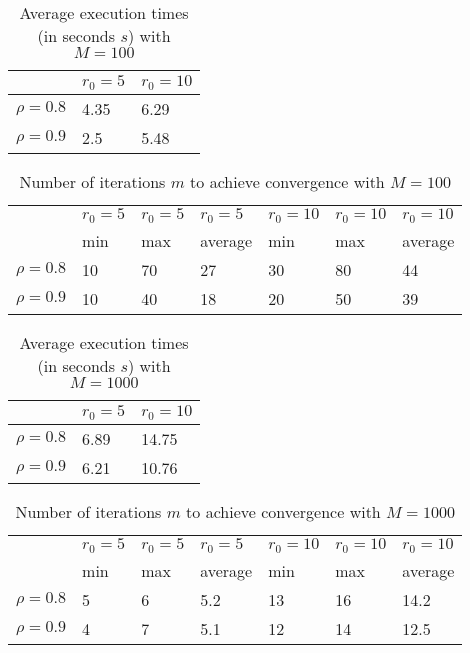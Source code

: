 \documentclass[a4paper,11pt,openright]{report}
\begin{document}
\begin{table}[H]
\centering
\addtolength{\leftskip}{-1.5cm}
\addtolength{\rightskip}{-1.5cm}
\begin{tabular}{|c|ll|}
\hline
$ $ & $r_0 = 5$ & $r_0 = 10$ \\
\hline
$\rho = 0.8$ & 4.35 & 6.29 \\

$\rho = 0.9$ & 2.5 & 5.48 \\
\hline
\end{tabular}
\caption{Average execution times (in seconds $s$) with $M = 100$}
\end{table}
\begin{table}[H]
\centering
\addtolength{\leftskip}{-1.5cm}
\addtolength{\rightskip}{-1.5cm}
\begin{tabular}{|c|llllll|}
\hline
$ $ & $r_0 = 5$ & $r_0 = 5$ & $r_0 = 5$ & $r_0 = 10$ & $r_0 = 10$ & $r_0 = 10$ \\
$ $ & min & max & average & min & max & average \\
\hline
$\rho = 0.8$ & 10 & 70 & 27 & 30 & 80 & 44 \\

$\rho = 0.9$ & 10 & 40 & 18 & 20 & 50 & 39 \\
\hline
\end{tabular}
\caption{Number of iterations $m$ to achieve convergence with $M = 100$}
\end{table}
\begin{table}[H]
\centering
\addtolength{\leftskip}{-1.5cm}
\addtolength{\rightskip}{-1.5cm}
\begin{tabular}{|c|ll|}
\hline
$ $ & $r_0 = 5$ & $r_0 = 10$ \\
\hline
$\rho = 0.8$ & 6.89 & 14.75 \\
$\rho = 0.9$ & 6.21 & 10.76 \\
\hline
\end{tabular}
\caption{Average execution times (in seconds $s$) with $M = 1000$}
\end{table}
\begin{table}[H]
\centering
\addtolength{\leftskip}{-1.5cm}
\addtolength{\rightskip}{-1.5cm}
\begin{tabular}{|c|llllll|}
\hline
$ $ & $r_0 = 5$ & $r_0 = 5$ & $r_0 = 5$ & $r_0 = 10$ & $r_0 = 10$ & $r_0 = 10$ \\
$ $ & min & max & average & min & max & average \\
\hline
$\rho = 0.8$ & 5 & 6 & 5.2 & 13 & 16 & 14.2 \\
$\rho = 0.9$ & 4 & 7 & 5.1 & 12 & 14 & 12.5 \\
\hline
\end{tabular}
\caption{Number of iterations $m$ to achieve convergence with $M = 1000$}
\end{table}
\newpage
\end{document}

